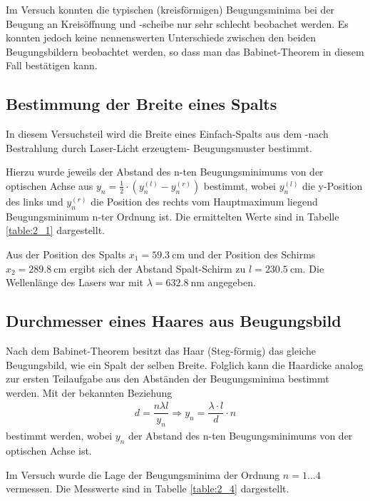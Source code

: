 \documentclass[ngerman, parskip*]{scrartcl}
\begin{document}
Im Versuch konnten die typischen (kreisförmigen) Beugungsminima bei der Beugung an Kreisöffnung und -scheibe nur sehr schlecht beobachet werden. Es konnten jedoch keine nennenswerten Unterschiede zwischen den beiden Beugungsbildern beobachtet werden, so dass man das Babinet-Theorem in diesem Fall bestätigen kann. 


\subsection{Bestimmung der Breite eines Spalts}

In diesem Versuchsteil wird die Breite eines Einfach-Spalts aus dem -nach Bestrahlung durch Laser-Licht erzeugtem- Beugungsmuster bestimmt. 

Hierzu wurde jeweils der Abstand des n-ten Beugungsminimums von der optischen Achse aus $y_n = \frac{1}{2}\cdot (y_n^{(l)} - y_n^{(r)})$ bestimmt, wobei $y_n^{(l)}$ die y-Position des links und $y_n^{(r)}$ die Position des rechts vom Hauptmaximum liegend Beugungsminimum n-ter Ordnung ist. Die ermittelten Werte sind in Tabelle \ref{table:2_1} dargestellt.


Aus der Position des Spalts $x_1 = \SI{59,3}{\cm}$ und der Position des Schirms $x_2 = \SI{289,8}{\cm}$ ergibt sich der Abstand Spalt-Schirm zu $l = \SI{230,5}{\cm}$. Die Wellenlänge des Lasers war mit $\lambda = \SI{632,8}{\nano\meter}$ angegeben. 


\subsection{Durchmesser eines Haares aus Beugungsbild}

Nach dem Babinet-Theorem besitzt das Haar (Steg-förmig) das gleiche Beugungsbild, wie ein Spalt der selben Breite. Folglich kann die Haardicke analog zur ersten Teilaufgabe aus den Abständen der Beugungsminima bestimmt werden. Mit der bekannten Beziehung
\begin{align*}
  d = \dfrac{n\lambda l}{y_n} \Rightarrow y_n = \dfrac{\lambda \cdot l}{d}\cdot n
\end{align*}
bestimmt werden, wobei $y_n$ der Abstand des n-ten Beugungsminimums von der optischen Achse ist. 

Im Versuch wurde die Lage der Beugungsminima der Ordnung $n=1\dots 4$ vermessen. Die Messwerte sind in Tabelle \ref{table:2_4} dargestellt. 
\end{document}
